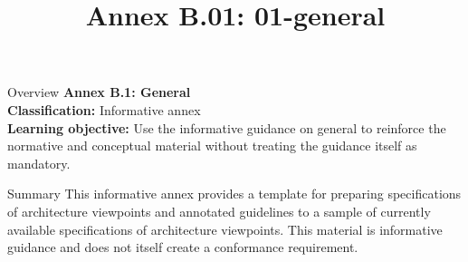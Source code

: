 \documentclass[10pt,letterpaper]{article}
\title{Annex B.01: 01-general}
\author{}
\date{}
\begin{document}
\maketitle
\begin{CornellOverviewBox}{Overview}
{\Large\bfseries\textcolor{CNavy}{Annex B.1: General}}\\[3pt]
{\small\textbf{Classification:} Informative annex}\\
{\small\textbf{Learning objective:} Use the informative guidance on general to reinforce the normative and conceptual material without treating the guidance itself as mandatory.}
\end{CornellOverviewBox}
\vspace{3pt}

\begin{CornellNotesTable}
\end{CornellNotesTable}


\begin{CornellSummaryBox}{Summary}
This informative annex provides a template for preparing specifications of architecture viewpoints and annotated guidelines to a sample of currently available specifications of architecture viewpoints. This material is informative guidance and does not itself create a conformance requirement.
\end{CornellSummaryBox}
\end{document}
